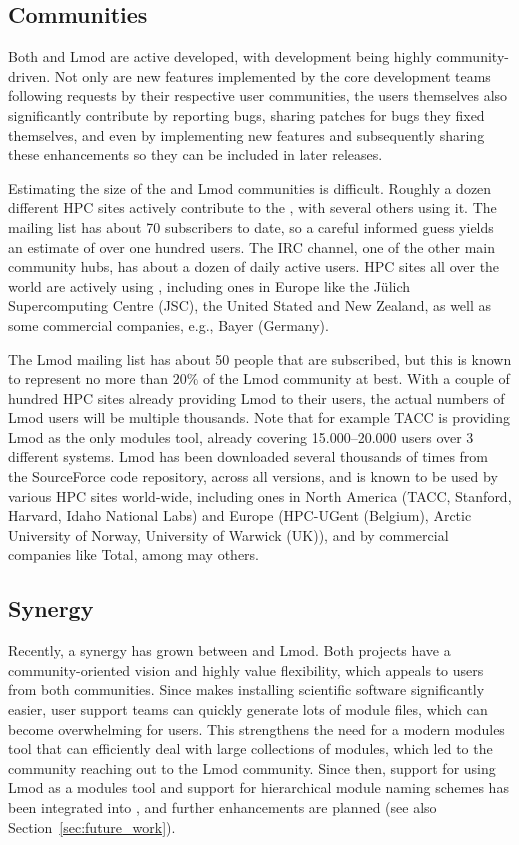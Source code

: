 \subsection{Communities}
\label{sec:communities}

Both \easybuild{} and Lmod are active developed, with development being
highly community-driven. Not only are new features implemented by the core
development teams following requests by their respective user communities, the
users themselves also significantly contribute by reporting bugs, sharing patches
for bugs they fixed themselves, and even by implementing new features
and subsequently sharing these enhancements so they can be included in later
releases.

Estimating the size of the \easybuild{} and Lmod communities is difficult.
Roughly a dozen different HPC sites actively contribute to the \easybuild{}, with
several others using it. The \easybuild{} mailing list has about 70 subscribers
to date, so a careful informed guess yields an estimate of over one hundred
users. The \easybuild{} IRC channel, one of the other main community hubs, has
about a dozen of daily active users. HPC sites all over the world are
actively using \easybuild{}, including ones in Europe like the
J\"ulich Supercomputing Centre (JSC), the United Stated and
New Zealand, as well as some commercial companies, e.g., Bayer (Germany).

The Lmod mailing list has about 50 people that are subscribed, but this
is known to represent no more than $20\%$ of the Lmod community at best. With a
couple of hundred HPC sites already providing Lmod to their users, the actual
numbers of Lmod users will be multiple thousands. Note that for example TACC is
providing Lmod as the only modules tool, already covering 15.000--20.000 users
over 3 different systems. Lmod has been downloaded several thousands of times
from the SourceForce code repository, across all versions, and is known to be
used by various HPC sites world-wide, including ones in North America (TACC,
Stanford, Harvard, Idaho National Labs) and Europe (HPC-UGent (Belgium), Arctic
University of Norway, University of Warwick (UK)), and by commercial companies
like Total, among may others.

\subsection{Synergy}

Recently, a synergy has grown between \easybuild{} and Lmod. Both projects have a
community-oriented vision and highly value flexibility, which appeals to users
from both communities. Since \easybuild{} makes installing scientific software
significantly easier, user support teams can quickly generate lots of module
files, which can become overwhelming for users. This strengthens the need for a
modern modules tool that can efficiently deal with large collections of modules,
which led to the \easybuild{} community reaching out to the Lmod community.
Since then, support for using Lmod as a modules tool and support for hierarchical
module naming schemes has been integrated into \easybuild{}, and further
enhancements are planned (see also Section~\ref{sec:future_work}).

